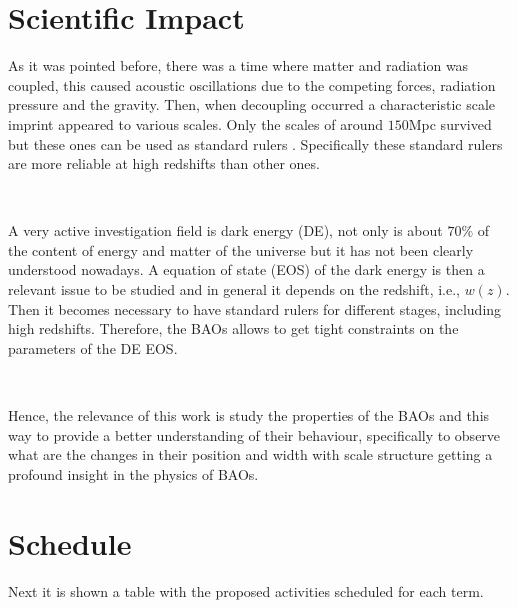 \documentclass[a4,useAMS,usenatbib,usegraphicx,12pt]{article}
\begin{document}
\section{Scientific Impact}

As it was pointed before, there was a time where matter and radiation was coupled, this caused acoustic
oscillations due to the competing forces, radiation pressure and the gravity. Then, when decoupling occurred 
a characteristic scale imprint appeared to various scales. Only the scales of around $150$Mpc survived 
but these ones can be used as standard rulers  \cite{Eisenstein98}. Specifically these standard rulers 
are more reliable  at high redshifts\cite{Wagner08} than other ones. 

\

A very active investigation field is dark energy (DE),  not only is about $70\%$ of the content of energy and
matter of the universe but it has not been clearly understood nowadays. A equation of state (EOS) of the dark
energy is then a relevant issue to be studied and in general it depends on the redshift, i.e., $w(z)$. Then
it becomes necessary to have standard rulers for different stages, including high redshifts. Therefore, the 
BAOs allows to get tight constraints on the parameters of the DE EOS. 

\

Hence, the relevance of this work is study the properties of the BAOs and this way to provide a better understanding
of their behaviour, specifically to observe what are the changes in their position and width with scale structure
getting a profound insight in the physics of BAOs. 


\section{Schedule}
Next it is shown a table with the proposed activities scheduled for each term.
\end{document}
